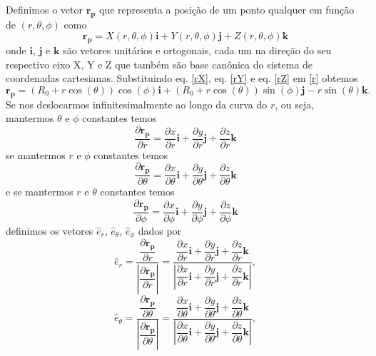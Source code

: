 \documentclass[12pt,oneside,a4paper]{abntex2}
\begin{document}
Definimos o vetor $\bm{r_p}$ que representa a posição de um ponto qualquer em função de $(r,\theta,\phi)$ como
\begin{equation}
\label{r}
\bm{r_p} = X(r,\theta,\phi) \bm{i} + Y(r,\theta,\phi) \bm{j} + Z(r,\theta,\phi) \bm{k}
\end{equation}
onde $\bm{i}$, $\bm{j}$ e $\bm{k}$ são vetores unitários e ortogonais, cada um na direção do seu respectivo eixo X, Y e Z que também são base canônica do sistema de coordenadas cartesianas. Substituindo eq. \ref{rX}, eq. \ref{rY} e eq. \ref{rZ} em \ref{r} obtemos
\begin{equation}
\label{r2}
\bm{r_p} = (R_0+r \cos(\theta)) \cos(\phi) \bm{i} + (R_0+r \cos(\theta)) \sin(\phi) \bm{j} -  r \sin(\theta) \bm{k}.
\end{equation}
Se nos deslocarmos infinitesimalmente ao longo da curva do $r$, ou seja, mantermos $\theta$ e $\phi$ constantes temos
\begin{equation}
\dfrac{\partial \bm{r_p}}{\partial r} = \dfrac{\partial x}{\partial r}\bm{i} + \dfrac{\partial y}{\partial r}\bm{j} + \dfrac{\partial z}{\partial r}\bm{k}
\end{equation}
se mantermos $r$ e $\phi$ constantes temos
\begin{equation}
\dfrac{\partial \bm{r_p}}{\partial \theta} = \dfrac{\partial x}{\partial \theta}\bm{i} + \dfrac{\partial y}{\partial \theta}\bm{j} + \dfrac{\partial z}{\partial \theta}\bm{k} 
\end{equation}
e se mantermos $r$ e $\theta$ constantes temos
\begin{equation}
\dfrac{\partial \bm{r_p}}{\partial \phi} = \dfrac{\partial x}{\partial \phi}\bm{i} + \dfrac{\partial y}{\partial \phi}\bm{j} + \dfrac{\partial z}{\partial \phi}\bm{k}
\end{equation}
definimos os vetores $\hat{e}_r$, $\hat{e}_\theta$, $\hat{e}_\phi$ dados por
\begin{equation}
\hat{e}_r = \frac{\dfrac{\partial \bm{r_p}}{\partial r}}{ | \dfrac{\partial \bm{r_p}}{\partial r} |} = \frac{\dfrac{\partial x}{\partial r}\bm{i} + \dfrac{\partial y}{\partial r}\bm{j} + \dfrac{\partial z}{\partial r}\bm{k}}{ |\dfrac{\partial x}{\partial r}\bm{i} + \dfrac{\partial y}{\partial r}\bm{j} + \dfrac{\partial z}{\partial r}\bm{k}|} ,
\end{equation}
\begin{equation}
\hat{e}_\theta = \frac{\dfrac{\partial \bm{r_p}}{\partial \theta}}{ | \dfrac{\partial \bm{r_p}}{\partial \theta} |} = \frac{ \dfrac{\partial x}{\partial \theta}\bm{i} + \dfrac{\partial y}{\partial \theta}\bm{j} + \dfrac{\partial z}{\partial \theta}\bm{k} }{ |  \dfrac{\partial x}{\partial \theta}\bm{i} + \dfrac{\partial y}{\partial \theta}\bm{j} + \dfrac{\partial z}{\partial \theta}\bm{k}  |},
\end{equation}
\end{document}
